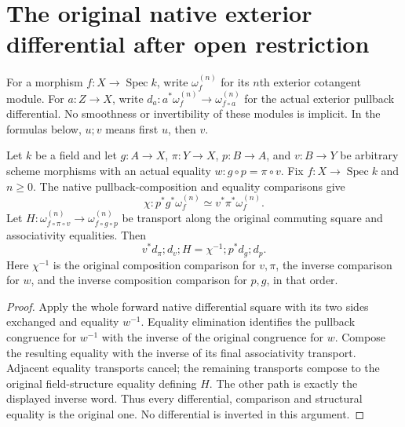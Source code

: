 \section{The original native exterior differential after open restriction}

For a morphism $f:X\to\operatorname{Spec}k$, write $\omega_f^{(n)}$
for its $n$th exterior cotangent module. For $a:Z\to X$, write
$d_a:a^*\omega_f^{(n)}\to\omega_{f\circ a}^{(n)}$ for the actual
exterior pullback differential. No smoothness or invertibility of these
modules is implicit. In the formulas below, $u;v$ means first $u$, then $v$.

\begin{lemma}
\label{lem:kn-native-restricted-differential-inverse-square}
\leanok
Let $k$ be a field and let
$g:A\to X$, $\pi:Y\to X$, $p:B\to A$, and $v:B\to Y$
be arbitrary scheme morphisms with an actual equality
$w:g\circ p=\pi\circ v$. Fix $f:X\to\operatorname{Spec}k$ and $n\geq0$.
The native pullback-composition and equality comparisons give
\[
 \chi:p^*g^*\omega_f^{(n)}\simeq v^*\pi^*\omega_f^{(n)}.
\]
Let $H:\omega_{f\circ\pi\circ v}^{(n)}\to
\omega_{f\circ g\circ p}^{(n)}$ be transport along the original
commuting square and associativity equalities. Then
\[
 v^*d_\pi;d_v;H=\chi^{-1};p^*d_g;d_p.
\]
Here $\chi^{-1}$ is the original composition comparison for $v,\pi$,
the inverse comparison for $w$, and the inverse composition comparison
for $p,g$, in that order.
\end{lemma}
\begin{proof}
Apply the whole forward native differential square with its two sides
exchanged and equality $w^{-1}$. Equality elimination identifies the
pullback congruence for $w^{-1}$ with the inverse of the original
congruence for $w$. Compose the resulting equality with the inverse of
its final associativity transport. Adjacent equality transports cancel;
the remaining transports compose to the original field-structure
equality defining $H$. The other path is exactly the displayed inverse
word. Thus every differential, comparison and structural equality is
the original one. No differential is inverted in this argument.
\end{proof}

